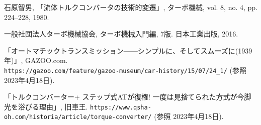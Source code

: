 \documentclass[10pt,a4j,dvipdfmx]{jarticle}
\begin{document}
\setlength{\abovedisplayskip}{1.5pt} 
\setlength{\belowdisplayskip}{0pt}

\pagestyle{fancy}
\setlength{\headheight}{5truemm}





\vspace{-5mm}
\begin{thebibliography}{3}
\setlength{\parskip}{0cm} %
\setlength{\itemsep}{0cm}

石原智男, 「流体トルクコンバータの技術的変遷」, ターボ機械, vol. 8, no. 4, pp. 224–228, 1980.

一般社団法人ターボ機械協会, ターボ機械入門編, 7版. 日本工業出版, 2016.

「オートマチックトランスミッション――シンプルに、そしてスムーズに(1939年)」, GAZOO.com.\\
\verb|https://gazoo.com/feature/gazoo-museum/car-history/15/07/24_1/| (参照 2023年4月18日).

「トルクコンバーター+ ステップ式ATが復権! 一度は見捨てられた方式が今脚光を浴びる理由」, 旧車王. 
\verb|https://www.qsha-oh.com/historia/article/torque-converter/| (参照 2023年4月18日).

\end{thebibliography}
\end{document}
